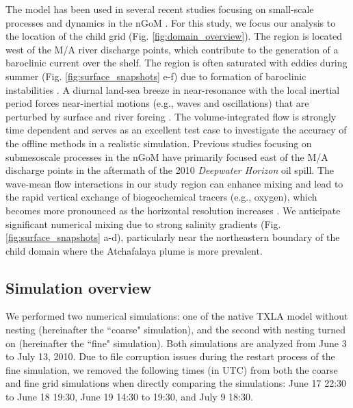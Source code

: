 The model has been used in several recent studies focusing on small-scale processes and dynamics in the nGoM \citep{Kobashi_2020,Qu_2021, Qu_2022_NIW, qu2022rapid, Xomchuk_2020}. For this study, we focus our analysis to the location of the child grid (Fig. \ref{fig:domain_overview}). The region is located west of the M/A river discharge points, which contribute to the generation of a baroclinic current over the shelf. The region is often saturated with eddies during summer (Fig. \ref{fig:surface_snapshots} e-f) due to formation of baroclinic instabilities \citep{Hetland_2017,Zhang_2012_numerical}. A diurnal land-sea breeze in near-resonance with the local inertial period forces near-inertial motions (e.g., waves and oscillations) that are perturbed by surface and river forcing \citep{zhang2009near}. The volume-integrated flow is strongly time dependent and serves as an excellent test case to investigate the accuracy of the offline methods in a realistic simulation. Previous studies focusing on submesoscale processes in the nGoM \citep{Barkan_2017,Luo_2016} have primarily focused east of the M/A discharge points in the aftermath of the 2010 \textit{Deepwater Horizon} oil spill. The wave-mean flow interactions in our study region can enhance mixing and lead to the rapid vertical exchange of biogeochemical tracers (e.g., oxygen), which becomes more pronounced as the horizontal resolution increases \citep{qu2022rapid}. We anticipate significant numerical mixing due to strong salinity gradients (Fig. \ref{fig:surface_snapshots} a-d), particularly near the northeastern boundary of the child domain where the Atchafalaya plume is more prevalent. 

\subsection{Simulation overview}

We performed two numerical simulations: one of the native TXLA model without nesting (hereinafter the ``coarse" simulation), and the second with nesting turned on (hereinafter the ``fine" simulation). Both simulations are analyzed from June 3 to July 13, 2010. Due to file corruption issues during the restart process of the fine simulation, we removed the following times (in UTC) from both the coarse and fine grid simulations when directly comparing the simulations: June 17 22:30 to June 18 19:30, June 19 14:30 to 19:30, and July 9 18:30. 

